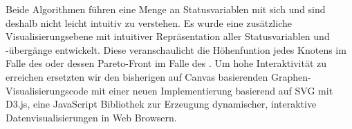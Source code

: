 Beide Algorithmen führen eine Menge an Statusvariablen mit sich und sind deshalb nicht leicht intuitiv zu verstehen. Es wurde eine zusätzliche Visualisierungsebene mit intuitiver Repräsentation aller Statusvariablen und -übergänge entwickelt. Diese veranschaulicht die Höhenfuntion jedes Knotens im Falle des \pushRelabelDE{} oder dessen Pareto-Front im Falle des . Um hohe Interaktivität zu erreichen ersetzten wir den bisherigen auf Canvas basierenden Graphen-Visualisierungscode mit einer neuen Implementierung basierend auf SVG mit D3.js, eine JavaScript Bibliothek zur Erzeugung dynamischer, interaktive Datenvisualisierungen in Web Browsern.

